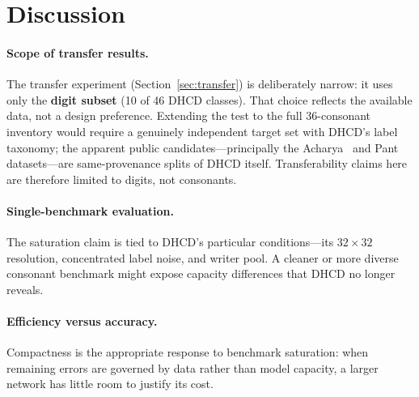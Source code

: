 \section{Discussion}
\label{sec:discussion}

\paragraph{Scope of transfer results.}
The transfer experiment (Section~\ref{sec:transfer}) is deliberately
narrow: it uses only the \textbf{digit subset} (10 of 46 DHCD classes).
That choice reflects the available data, not a design preference.
Extending the test to the full 36-consonant inventory would require a
genuinely independent target set with DHCD's label taxonomy; the apparent
public candidates---principally the Acharya~\cite{acharya2015dhcd} and
Pant datasets---are same-provenance splits of DHCD itself.
Transferability claims here are therefore limited to digits, not consonants.

\paragraph{Single-benchmark evaluation.}
The saturation claim is tied to DHCD's particular conditions---its
$32{\times}32$ resolution, concentrated label noise, and writer pool.  A
cleaner or more diverse consonant benchmark might expose capacity
differences that DHCD no longer reveals.

\paragraph{Efficiency versus accuracy.}
Compactness is the appropriate response to benchmark saturation: when remaining
errors are governed by data rather than model capacity, a larger network has
little room to justify its cost.
